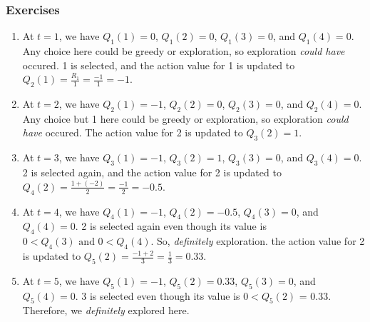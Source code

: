 \subsubsection{Exercises}
{
\begin{enumerate}
\item At \(t = 1\), we have \(Q_1(1) = 0\), \(Q_1(2) = 0\), \(Q_1(3) = 0\), and \(Q_1(4) = 0\). Any choice here could be greedy or exploration, so exploration \textit{could have} occured. 1 is selected, and the action value for 1 is updated to \(Q_2(1) = \frac{R_1}{1} = \frac{-1}{1} = -1\).
\item At \(t = 2\), we have \(Q_2(1) = -1\), \(Q_2(2) = 0\), \(Q_2(3) = 0\), and \(Q_2(4) = 0\). Any choice but 1 here could be greedy or exploration, so exploration \textit{could have} occured. The action value for 2 is updated to \(Q_3(2) = 1\).
\item At \(t = 3\), we have \(Q_3(1) = -1\), \(Q_3(2) = 1\), \(Q_3(3) = 0\), and \(Q_3(4) = 0\). 2 is selected again, and the action value for 2 is updated to \(Q_4(2) = \frac{1 + (-2)}{2} = \frac{-1}{2} = -0.5\).
\item At \(t = 4\), we have \(Q_4(1) = -1\), \(Q_4(2) = -0.5\), \(Q_4(3) = 0\), and \(Q_4(4) = 0\). 2 is selected again even though its value is \(0 < Q_4(3) \text{ and } 0 < Q_4(4) \). So, \textit{definitely} exploration.  the action value for 2 is updated to \(Q_5(2) = \frac{-1 + 2}{3} = \frac{1}{3} = 0.33\).
\item At \(t = 5\), we have \(Q_5(1) = -1\), \(Q_5(2) = 0.33\), \(Q_5(3) = 0\), and \(Q_5(4) = 0\). 3 is selected even though its value is \(0 < Q_5(2)\) = 0.33. Therefore, we \textit{definitely} explored here. 
\end{enumerate}

}
